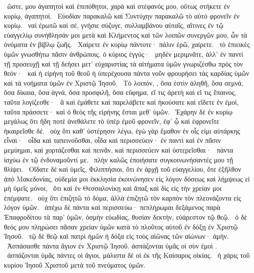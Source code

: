 ~ὥστε,  μου ἀγαπητοὶ καὶ ἐπιπόθητοι, χαρὰ καὶ στέφανός μου, οὕτως στήκετε ἐν κυρίῳ, ἀγαπητοί.
~Εὐοδίαν παρακαλῶ καὶ Συντύχην παρακαλῶ τὸ αὐτὸ φρονεῖν ἐν κυρίῳ.
~ναὶ ἐρωτῶ καὶ σέ, γνήσιε σύζυγε, συλλαμβάνου αὐταῖς, αἵτινες ἐν τῷ εὐαγγελίῳ συνήθλησάν μοι μετὰ καὶ Κλήμεντος καὶ τῶν λοιπῶν συνεργῶν μου, ὧν τὰ ὀνόματα ἐν βίβλῳ ζωῆς.
~Χαίρετε ἐν κυρίῳ πάντοτε· πάλιν ἐρῶ, χαίρετε.
~τὸ ἐπιεικὲς ὑμῶν γνωσθήτω πᾶσιν ἀνθρώποις. ὁ κύριος ἐγγύς·
~μηδὲν μεριμνᾶτε, ἀλλ’ ἐν παντὶ τῇ προσευχῇ καὶ τῇ δεήσει μετ’ εὐχαριστίας τὰ αἰτήματα ὑμῶν γνωριζέσθω πρὸς τὸν θεόν·
~καὶ ἡ εἰρήνη τοῦ θεοῦ ἡ ὑπερέχουσα πάντα νοῦν φρουρήσει τὰς καρδίας ὑμῶν καὶ τὰ νοήματα ὑμῶν ἐν Χριστῷ Ἰησοῦ.
~Τὸ λοιπόν, , ὅσα ἐστὶν ἀληθῆ, ὅσα σεμνά, ὅσα δίκαια, ὅσα ἁγνά, ὅσα προσφιλῆ, ὅσα εὔφημα, εἴ τις ἀρετὴ καὶ εἴ τις ἔπαινος, ταῦτα λογίζεσθε·
~ἃ καὶ ἐμάθετε καὶ παρελάβετε καὶ ἠκούσατε καὶ εἴδετε ἐν ἐμοί, ταῦτα πράσσετε· καὶ ὁ θεὸς τῆς εἰρήνης ἔσται μεθ’ ὑμῶν.
~Ἐχάρην δὲ ἐν κυρίῳ μεγάλως ὅτι ἤδη ποτὲ ἀνεθάλετε τὸ ὑπὲρ ἐμοῦ φρονεῖν, ἐφ’ ᾧ καὶ ἐφρονεῖτε ἠκαιρεῖσθε δέ.
~οὐχ ὅτι καθ’ ὑστέρησιν λέγω, ἐγὼ γὰρ ἔμαθον ἐν οἷς εἰμι αὐτάρκης εἶναι·
~οἶδα καὶ ταπεινοῦσθαι, οἶδα καὶ περισσεύειν· ἐν παντὶ καὶ ἐν πᾶσιν μεμύημαι, καὶ χορτάζεσθαι καὶ πεινᾶν, καὶ περισσεύειν καὶ ὑστερεῖσθαι·
~πάντα ἰσχύω ἐν τῷ ἐνδυναμοῦντί με.
~πλὴν καλῶς ἐποιήσατε συγκοινωνήσαντές μου τῇ θλίψει.
~Οἴδατε δὲ καὶ ὑμεῖς, Φιλιππήσιοι, ὅτι ἐν ἀρχῇ τοῦ εὐαγγελίου, ὅτε ἐξῆλθον ἀπὸ Μακεδονίας, οὐδεμία μοι ἐκκλησία ἐκοινώνησεν εἰς λόγον δόσεως καὶ λήμψεως εἰ μὴ ὑμεῖς μόνοι,
~ὅτι καὶ ἐν Θεσσαλονίκῃ καὶ ἅπαξ καὶ δὶς εἰς τὴν χρείαν μοι ἐπέμψατε.
~οὐχ ὅτι ἐπιζητῶ τὸ δόμα, ἀλλὰ ἐπιζητῶ τὸν καρπὸν τὸν πλεονάζοντα εἰς λόγον ὑμῶν.
~ἀπέχω δὲ πάντα καὶ περισσεύω· πεπλήρωμαι δεξάμενος παρὰ Ἐπαφροδίτου τὰ παρ’ ὑμῶν, ὀσμὴν εὐωδίας, θυσίαν δεκτήν, εὐάρεστον τῷ θεῷ.
~ὁ δὲ θεός μου πληρώσει πᾶσαν χρείαν ὑμῶν κατὰ τὸ πλοῦτος αὐτοῦ ἐν δόξῃ ἐν Χριστῷ Ἰησοῦ.
~τῷ δὲ θεῷ καὶ πατρὶ ἡμῶν ἡ δόξα εἰς τοὺς αἰῶνας τῶν αἰώνων· ἀμήν.
~Ἀσπάσασθε πάντα ἅγιον ἐν Χριστῷ Ἰησοῦ. ἀσπάζονται ὑμᾶς οἱ σὺν ἐμοὶ .
~ἀσπάζονται ὑμᾶς πάντες οἱ ἅγιοι, μάλιστα δὲ οἱ ἐκ τῆς Καίσαρος οἰκίας.
~ἡ χάρις τοῦ κυρίου Ἰησοῦ Χριστοῦ μετὰ τοῦ πνεύματος ὑμῶν.


